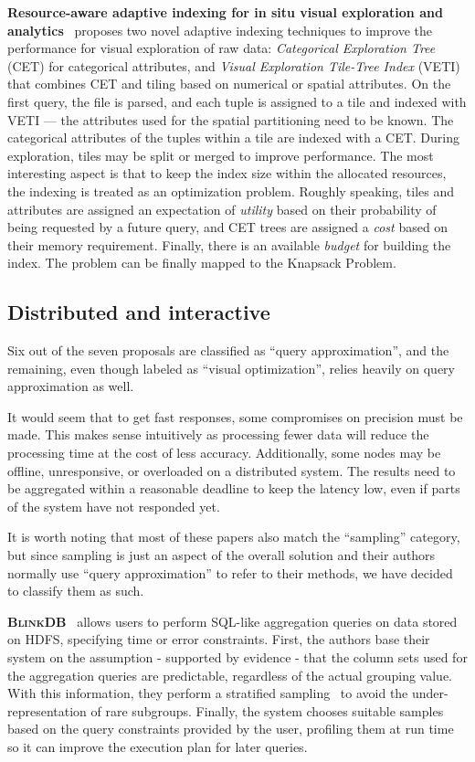 \textbf{Resource-aware adaptive indexing for in situ visual exploration and
analytics}~\cite{maroulis_resourceaware_2023} proposes two novel adaptive indexing techniques
to improve the performance for visual exploration of raw data:
\textit{Categorical Exploration Tree} (CET) for categorical attributes, and \textit{Visual Exploration
Tile-Tree Index} (VETI) that combines CET and tiling based on numerical or spatial attributes.
On the first query, the file is parsed, and each tuple is assigned to a tile and indexed with VETI
--- the attributes used for the spatial partitioning need to be known. The categorical attributes
of the tuples within a tile are indexed with a CET. During exploration, tiles may be split or merged
to improve performance. The most interesting aspect is that to keep the index size within
the allocated resources, the indexing is treated as an optimization problem. Roughly speaking,
tiles and attributes are assigned an expectation of \textit{utility} based on their probability of
being requested by a future query, and CET trees are assigned a \textit{cost} based on their memory
requirement. Finally, there is an available \textit{budget} for building the index.
The problem can be finally mapped to the Knapsack Problem.

\subsection{Distributed and interactive}
Six out of the seven proposals are classified as ``query approximation'', and the 
remaining, even though labeled as ``visual optimization'',
relies heavily on query approximation as well.

It would seem that to get fast responses, some compromises on precision 
must be made. This makes sense intuitively as processing fewer 
data will reduce the processing time at the cost of less accuracy. 
Additionally, some nodes may be offline, 
unresponsive, or overloaded on a distributed system. The results 
need to be aggregated within a reasonable deadline to keep the latency low, even if parts of the system 
have not responded yet.

It is worth noting that most of these papers also match the ``sampling''
category, but since sampling is just an aspect of the overall solution and their 
authors normally use ``query approximation'' to refer to their methods, we have 
decided to classify them as such.

\medskip

\textbf{\textsc{BlinkDB}}~\cite{Agarwal2013} allows users to perform SQL-like aggregation 
queries on data stored on HDFS, specifying time or error constraints. First, 
the authors base their system on the assumption - supported by evidence - that 
the column sets used for the aggregation queries are predictable, regardless of 
the actual grouping value. With this information, they perform a stratified 
sampling~\cite{Lohr2009} to avoid the under-representation of rare subgroups. 
Finally, the system chooses suitable samples based on the query constraints 
provided by the user, profiling them at run time so it can improve the 
execution plan for later queries.

